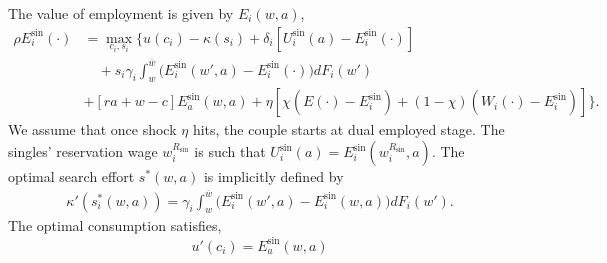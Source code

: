 \documentclass[11pt]{article}
\begin{document}
The value of employment is given by $E_i(w,a)$,
\begin{align*}
    \rho E_i^\text{sin}(\cdot)&=\max_{c_i, s_i} \bigg\{ u(c_i)-\kappa(s_i)+\delta_i[U_i^\text{sin}(a)-E_i^\text{sin}(\cdot)]\\&\quad+s_i\gamma_i\int_{w}^{\overline{w}}\big(E_i^\text{sin}(w',a)-E_i^\text{sin}(\cdot)\big)dF_i(w')\\& + [ra + w - c]E_a^\text{sin}(w,a) + \eta [\chi(E(\cdot) - E_i^\text{sin}) + (1-\chi)(W_i(\cdot) - E_i^\text{sin})] \bigg\}.
\end{align*}
We assume that once shock $\eta$ hits, the couple starts at dual employed stage. The singles' reservation wage $w_i^{R_\text{sin}}$ is such that $U_i^\text{sin}(a)=E_i^\text{sin}(w_i^{R_\text{sin}},a)$. The optimal search effort $s^*(w,a)$ is implicitly defined by \begin{align*}
    \kappa'(s_i^*(w,a))=\gamma_i\int_{w}^{\overline{w}}\big(E_i^\text{sin}(w',a)-E_i^\text{sin}(w,a)\big)dF_i(w').
\end{align*}
The optimal consumption satisfies,
\[
u'(c_i) = E_a^\text{sin}(w,a)
\]


\end{document}
